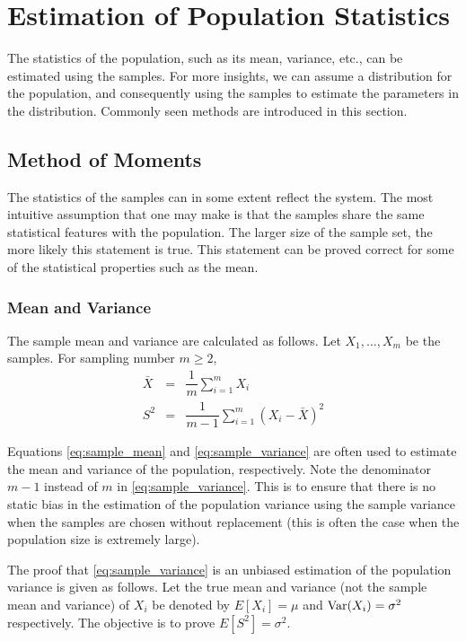 \chapter{Estimation of Population Statistics} \label{ch:estimation}

The statistics of the population, such as its mean, variance, etc., can be estimated using the samples. For more insights, we can assume a distribution for the population, and consequently using the samples to estimate the 
parameters in the distribution. Commonly seen methods are introduced in this section.

\section{Method of Moments}

The statistics of the samples can in some extent reflect the system. The most intuitive assumption that one may make is that the samples share the same statistical features with the population. The larger size of the sample set, the more likely this statement is true. This statement can be proved correct for some of the statistical properties such as the mean.

\subsection{Mean and Variance}

The sample mean and variance are calculated as follows. Let $X_1, \ldots, X_m$ be the samples. For sampling number $m\geq 2$,
\begin{eqnarray}
	\bar{X} &=& \dfrac{1}{m}\sum_{i=1}^{m}X_i \label{eq:sample_mean} \\
	S^2 &=& \dfrac{1}{m-1}\sum_{i=1}^{m}\left(X_i - \bar{X}\right)^2 \label{eq:sample_variance}
\end{eqnarray}

Equations \eqref{eq:sample_mean} and \eqref{eq:sample_variance} are often used to estimate the mean and variance of the population, respectively. Note the denominator $m-1$ instead of $m$ in \eqref{eq:sample_variance}. This is to ensure that there is no static bias in the estimation of the population variance using the sample variance when the samples are chosen without replacement (this is often the case when the population size is extremely large).

The proof that \eqref{eq:sample_variance} is an unbiased estimation of the population variance is given as follows. Let the true mean and variance (not the sample mean and variance) of $X_i$ be denoted by $E[X_i] = \mu$ and $\textup{Var}(X_i)=\sigma^2$ respectively. The objective is to prove $E\left[S^2\right]=\sigma^2$.

